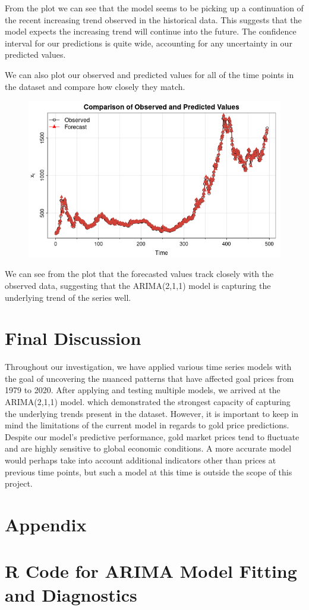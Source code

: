 \documentclass[12pt]{article}
\begin{document}
From the plot we can see that the model seems to be picking up a continuation of the recent increasing trend observed in the historical data. This suggests that the model expects the increasing trend will continue into the future. The confidence interval for our predictions is quite wide, accounting for any uncertainty in our predicted values. 

We can also plot our observed and predicted values for all of the time points in the dataset and compare how closely they match.

\begin{figure}
    \centering
    \includegraphics[width=1\textwidth]{images/observed_predicted.png}
    \caption{}
    \label{fig:enter-label}
\end{figure}

We can see from the plot that the forecasted values track closely with the observed data, suggesting that the ARIMA(2,1,1) model is capturing the underlying trend of the series well.

\section{Final Discussion}
Throughout our investigation, we have applied various time series models with the goal of uncovering the nuanced patterns that have affected goal prices from 1979 to 2020. After applying and testing multiple models, we arrived at the ARIMA(2,1,1) model. which demonstrated the strongest capacity of capturing the underlying trends present in the dataset. However, it is important to keep in mind the limitations of the current model in regards to gold price predictions. Despite our model's predictive performance, gold market prices tend to fluctuate and are highly sensitive to global economic conditions. A more accurate model would perhaps take into account additional indicators other than prices at previous time points, but such a model at this time is outside the scope of this project.




\appendix
\section*{Appendix}
\section{R Code for ARIMA Model Fitting and Diagnostics}

\end{document}
